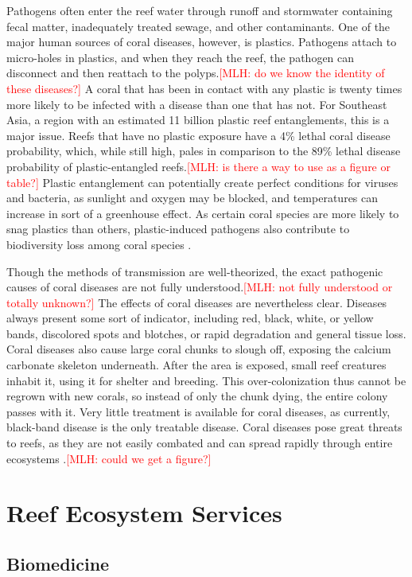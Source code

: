 \documentclass{book}\usepackage{knitr}
\newcommand{\red}[1]{\textcolor{red}{[MLH: #1]}}
\begin{document}
{Pathogens often enter the reef water through runoff and stormwater containing fecal matter, inadequately treated sewage, and other contaminants. One of the major human sources of coral diseases, however, is plastics. Pathogens attach to micro-holes in plastics, and when they reach the reef, the pathogen can disconnect and then reattach to the polyps.\red{do we know the identity of these diseases?} A coral that has been in contact with any plastic is twenty times more likely to be infected with a disease than one that has not. For Southeast Asia, a region with an estimated 11 billion plastic reef entanglements, this is a major issue. Reefs that have no plastic exposure have a 4\% lethal coral disease probability, which, while still high, pales in comparison to the 89\% lethal disease probability of plastic-entangled reefs.\red{is there a way to use as a figure or table?} Plastic entanglement can potentially create perfect conditions for viruses and bacteria, as sunlight and oxygen may be blocked, and temperatures can increase in sort of a greenhouse effect. As certain coral species are more likely to snag plastics than others, plastic-induced pathogens also contribute to biodiversity loss among coral species \citep{Thompson}.

Though the methods of transmission are well-theorized, the exact pathogenic causes of coral diseases are not fully understood.\red{not fully understood or totally unknown?} The effects of coral diseases are nevertheless clear. Diseases always present some sort of indicator, including red, black, white, or yellow bands, discolored spots and blotches, or rapid degradation and general tissue loss. Coral diseases also cause large coral chunks to slough off, exposing the calcium carbonate skeleton underneath. After the area is exposed, small reef creatures inhabit it, using it for shelter and breeding. This over-colonization thus cannot be regrown with new corals, so instead of only the chunk dying, the entire colony passes with it. Very little treatment is available for coral diseases, as currently, black-band disease is the only treatable disease. Coral diseases pose great threats to reefs, as they are not easily combated and can spread rapidly through entire ecosystems \citep{coraldiseasenoaa}.\red{could we get a figure?}

\section{Reef Ecosystem Services}

\subsection{Biomedicine}

}
\end{document}
